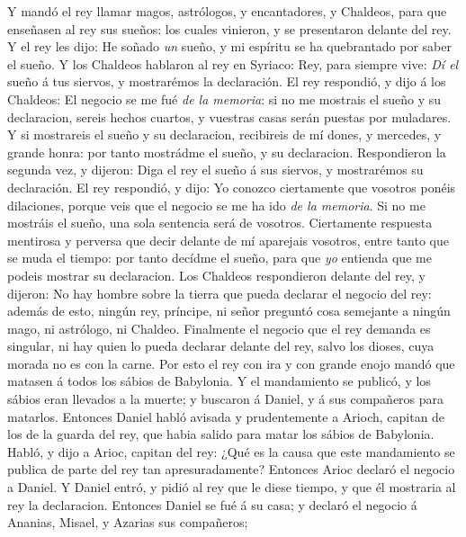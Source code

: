\bverse Y mandó el rey llamar magos, astrólogos,
  y encantadores, y Chaldeos, para 
  que enseñasen al rey sus sueños: los
  cuales vinieron, y se presentaron delante
  del rey.
\bverse Y el rey les dijo: He soñado \emph{un} sueño, 
  y mi espíritu se ha quebrantado por
  saber el sueño.
\bverse Y los Chaldeos hablaron al rey en
  Syriaco: Rey, para siempre vive: \emph{Dí el}
  sueño á tus siervos, y mostrarémos la
  declaración.
\bverse El rey respondió, y dijo á los Chaldeos:
  El negocio se me fué \emph{de la memoria}:
  si no me mostrais el sueño y su
  declaracion, sereis hechos cuartos, y 
  vuestras casas serán puestas por muladares.
\bverse Y si mostrareis el sueño y su 
  declaracion, recibireis de mí dones, y mercedes,
  y grande honra: por tanto mostrádme
  el sueño, y su declaracion.
\bverse Respondieron la segunda vez, y dijeron:
  Diga el rey el sueño á sus siervos,
  y mostrarémos su declaración.
\bverse El rey respondió, y dijo: Yo conozco
  ciertamente que vosotros ponéis dilaciones,
  porque veis que el negocio se
  me ha ido \emph{de la memoria}.
\bverse Si no me mostráis el sueño, una sola
  sentencia será de vosotros. Ciertamente 
  respuesta mentirosa y perversa que decir
  delante de mí aparejais vosotros,
  entre tanto que se muda el tiempo: por 
  tanto decídme el sueño, para que \emph{yo}
  entienda que me podeis mostrar su
  declaracion.
\bverse Los Chaldeos respondieron delante
  del rey, y dijeron: No hay hombre sobre 
  la tierra que pueda declarar el negocio
  del rey: además de esto, ningún rey,
  príncipe, ni señor preguntó cosa semejante
  a ningún mago, ni astrólogo, ni Chaldeo.
\bverse Finalmente el negocio que el rey
  demanda es singular, ni hay quien lo
  pueda declarar delante del rey, salvo los
  dioses, cuya morada no es con la carne.
\bverse Por esto el rey con ira y con grande
  enojo mandó que matasen á todos los
  sábios de Babylonia.
\bverse Y el mandamiento se publicó, y los
  sábios eran llevados a la muerte;
  y buscaron á Daniel, y á sus compañeros para
  matarlos.
\bverse Entonces Daniel habló avisada y
  prudentemente a Arioch, capitan de los de
  la guarda del rey, que habia salido para
  matar los sábios de Babylonia.
\bverse Habló, y dijo a Arioc, capitan del
  rey: ¿Qué es la causa que este
  mandamiento se publica de parte del rey tan
  apresuradamente? Entonces Arioc
  declaró el negocio a Daniel.
\bverse Y Daniel entró, y pidió al rey que le
  diese tiempo, y que él mostraria al rey
  la declaracion.
\bverse Entonces Daniel se fué á su casa; y
  declaró el negocio á Ananias, Misael, y
  Azarias sus compañeros;
